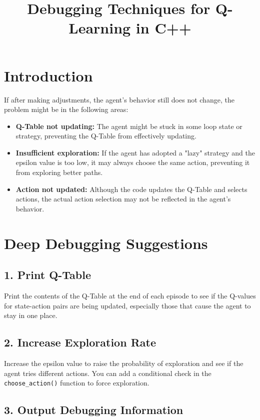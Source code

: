 \documentclass{article}
\title{Debugging Techniques for Q-Learning in C++}
\author{}
\date{}
\begin{document}
\maketitle

\section*{Introduction}

If after making adjustments, the agent's behavior still does not change, the problem might be in the following areas:

\begin{itemize}
    \item \textbf{Q-Table not updating:} The agent might be stuck in some loop state or strategy, preventing the Q-Table from effectively updating.
    \item \textbf{Insufficient exploration:} If the agent has adopted a "lazy" strategy and the epsilon value is too low, it may always choose the same action, preventing it from exploring better paths.
    \item \textbf{Action not updated:} Although the code updates the Q-Table and selects actions, the actual action selection may not be reflected in the agent's behavior.
\end{itemize}

\section*{Deep Debugging Suggestions}

\subsection*{1. Print Q-Table}

Print the contents of the Q-Table at the end of each episode to see if the Q-values for state-action pairs are being updated, especially those that cause the agent to stay in one place.

\subsection*{2. Increase Exploration Rate}

Increase the epsilon value to raise the probability of exploration and see if the agent tries different actions. You can add a conditional check in the \texttt{choose\_action()} function to force exploration.

\subsection*{3. Output Debugging Information}
\end{document}
